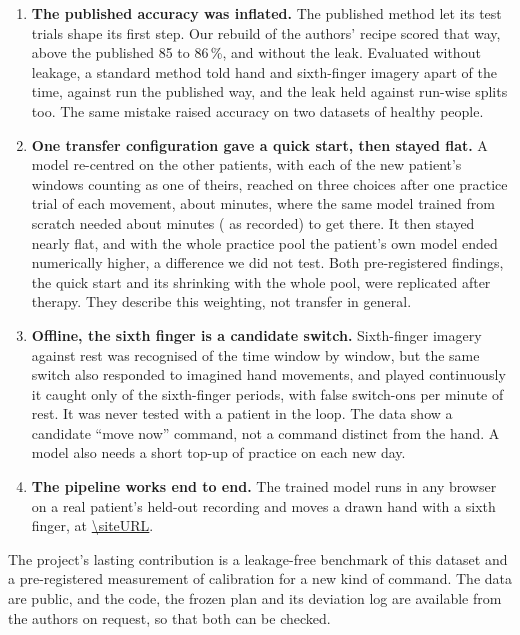 \begin{enumerate}
  \item \textbf{The published accuracy was inflated.} The published method let its test
  trials shape its first step. Our rebuild of the authors' recipe scored
  \pct{\rqOneCspLdaReplicaPaperReplicaMean} that way, above the published 85 to 86\,\%, and
  \pct{\rqOneCspLdaReplicaCvLeakfreeMean} without the leak. Evaluated without leakage, a
  standard method told hand and sixth-finger imagery apart
  \pct{\rqOneCspLdaCvLeakfreeMean} of the time, against \pct{\rqOneCspLdaPaperReplicaMean}
  run the published way, and the leak held against run-wise splits too. The same mistake
  raised accuracy on two datasets of healthy people.
  \item \textbf{One transfer configuration gave a quick start, then stayed flat.} A model
  re-centred on the other patients, with each of the new patient's windows counting as one
  of theirs, reached \pct{\rqTwoRestAhSfRctTslrKOneMean} on three choices after one
  practice trial of each movement, about \rqTwoMinutesKOne{} minutes, where the same model
  trained from scratch needed about \rqTwoMinutesKTen{} minutes (\rqTwoMinutesRecordedKTen{}
  as recorded) to get there. It then stayed nearly flat, and with the whole practice pool
  the patient's own model ended numerically higher, a difference we did not test. Both
  pre-registered findings, the quick start and its shrinking with the whole pool, were
  replicated after therapy. They describe this weighting, not transfer in general.
  \item \textbf{Offline, the sixth finger is a candidate switch.} Sixth-finger imagery
  against rest was recognised \pct{\exFourTsLrCentralMean} of the time window by window,
  but the same switch also responded to imagined hand movements, and played continuously
  it caught only \pct{\exFiveFingerFingerOnMean} of the sixth-finger periods, with
  \exFiveFingerFalsePerMinMean{} false switch-ons per minute of rest. It was never tested
  with a patient in the loop. The data show a candidate ``move now'' command, not a
  command distinct from the hand. A model also needs a short top-up of practice on each
  new day.
  \item \textbf{The pipeline works end to end.} The trained model runs in any browser on a
  real patient's held-out recording and moves a drawn hand with a sixth finger, at
  \url{\siteURL}.
\end{enumerate}

The project's lasting contribution is a leakage-free benchmark of this dataset and a
pre-registered measurement of calibration for a new kind of command. The data are public,
and the code, the frozen plan and its deviation log are available from the authors on
request, so that both can be checked.

